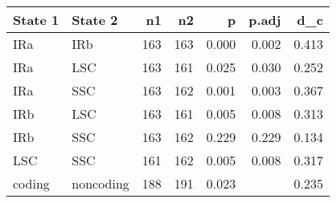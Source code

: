 \begin{table}[ht]
\centering
\begin{tabular}{llrrrrr}
  \hline
State 1 & State 2 & n1 & n2 & p & p.adj & d\_c \\ 
  \hline
IRa & IRb &  163 &  163 & 0.000 & 0.002 & 0.413 \\ 
  IRa & LSC &  163 &  161 & 0.025 & 0.030 & 0.252 \\ 
  IRa & SSC &  163 &  162 & 0.001 & 0.003 & 0.367 \\ 
  IRb & LSC &  163 &  161 & 0.005 & 0.008 & 0.313 \\ 
  IRb & SSC &  163 &  162 & 0.229 & 0.229 & 0.134 \\ 
  LSC & SSC &  161 &  162 & 0.005 & 0.008 & 0.317 \\ 
  coding & noncoding &  188 &  191 & 0.023 &  & 0.235 \\ 
   \hline
\end{tabular}
\end{table}
